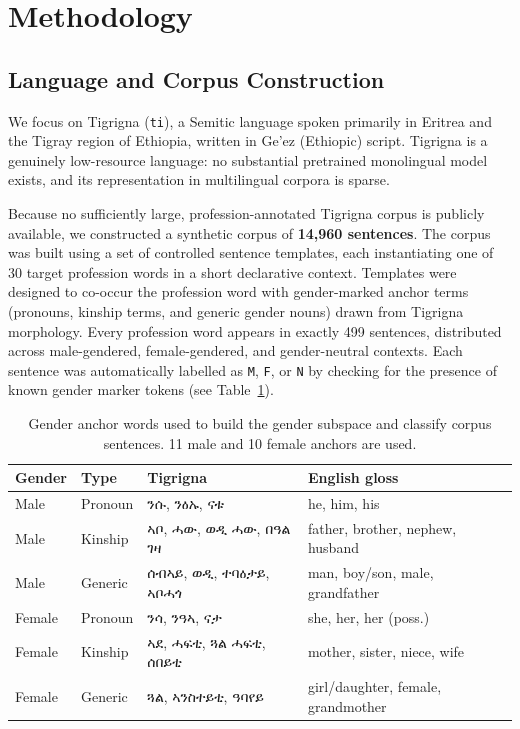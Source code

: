 
\section{Methodology}

\subsection{Language and Corpus Construction}

We focus on Tigrigna (\texttt{ti}), a Semitic language spoken primarily in
Eritrea and the Tigray region of Ethiopia, written in Ge'ez (Ethiopic) script.
Tigrigna is a genuinely low-resource language: no substantial pretrained
monolingual model exists, and its representation in multilingual corpora is
sparse.

Because no sufficiently large, profession-annotated Tigrigna corpus is publicly
available, we constructed a synthetic corpus of \textbf{14{,}960 sentences}.
The corpus was built using a set of controlled sentence templates, each
instantiating one of 30 target profession words in a short declarative context.
Templates were designed to co-occur the profession word with gender-marked
anchor terms (pronouns, kinship terms, and generic gender nouns) drawn from
Tigrigna morphology. Every profession word appears in exactly 499 sentences,
distributed across male-gendered, female-gendered, and gender-neutral contexts.
Each sentence was automatically labelled as \texttt{M}, \texttt{F}, or
\texttt{N} by checking for the presence of known gender marker tokens
(see Table~\ref{tab:anchors}).

\begin{table}[h]
\centering
\small
\begin{tabular}{llll}
\toprule
\textbf{Gender} & \textbf{Type} & \textbf{Tigrigna} & \textbf{English gloss} \\
\midrule
Male   & Pronoun   & ንሱ, ንዕኡ, ናቱ              & he, him, his \\
Male   & Kinship   & ኣቦ, ሓው, ወዲ ሓው, በዓል ገዛ   & father, brother, nephew, husband \\
Male   & Generic   & ሰብኣይ, ወዲ, ተባዕታይ, ኣቦሓጎ  & man, boy/son, male, grandfather \\
\midrule
Female & Pronoun   & ንሳ, ንዓኣ, ናታ             & she, her, her (poss.) \\
Female & Kinship   & ኣደ, ሓፍቲ, ጓል ሓፍቲ, ሰበይቲ  & mother, sister, niece, wife \\
Female & Generic   & ጓል, ኣንስተይቲ, ዓባየይ        & girl/daughter, female, grandmother \\
\bottomrule
\end{tabular}
\caption{Gender anchor words used to build the gender subspace and classify
corpus sentences. 11 male and 10 female anchors are used.}
\label{tab:anchors}
\end{table}

